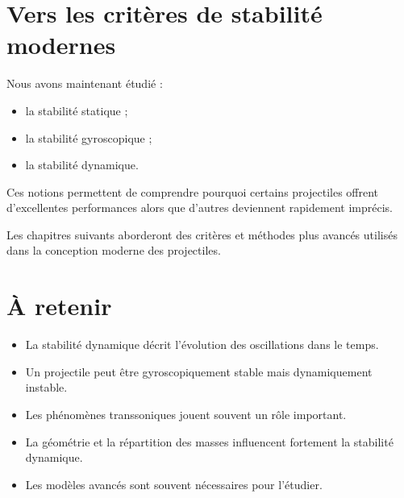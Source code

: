 \section{Vers les critères de stabilité modernes}

Nous avons maintenant étudié :

\begin{itemize}
    \item la stabilité statique ;
    \item la stabilité gyroscopique ;
    \item la stabilité dynamique.
\end{itemize}

Ces notions permettent de comprendre pourquoi certains projectiles offrent
d'excellentes performances alors que d'autres deviennent rapidement
imprécis.

Les chapitres suivants aborderont des critères et méthodes plus avancés
utilisés dans la conception moderne des projectiles.

\section{À retenir}

\begin{aretenir}

\begin{itemize}
    \item La stabilité dynamique décrit l'évolution des oscillations dans le
          temps.
    \item Un projectile peut être gyroscopiquement stable mais
          dynamiquement instable.
    \item Les phénomènes transsoniques jouent souvent un rôle important.
    \item La géométrie et la répartition des masses influencent fortement la
          stabilité dynamique.
    \item Les modèles avancés sont souvent nécessaires pour l'étudier.
\end{itemize}

\end{aretenir}
